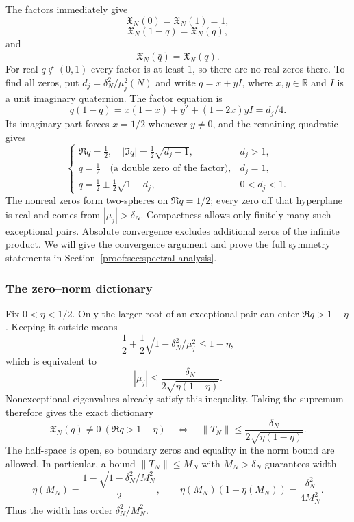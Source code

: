 \documentclass[12pt,a4paper]{amsart}
\numberwithin{equation}{section}
\def\le{\leqslant}
\theoremstyle{plain}
\theoremstyle{definition}
\theoremstyle{remark}
\begin{document}
\label{story:riemann-zeros}
The factors immediately give
\begin{equation}\label{sym:normalization}
 \mathfrak X_N(0)=\mathfrak X_N(1)=1,
\end{equation}
\begin{equation}\label{sym:functional-equation}
 \mathfrak X_N(1-q)=\mathfrak X_N(q),
\end{equation}
and
\begin{equation}\label{sym:conjugation}
 \mathfrak X_N(\bar q)=\overline{\mathfrak X_N(q)}.
\end{equation}
For real $q\notin(0,1)$ every factor is at least $1$, so there
are no real zeros there. To find all zeros, put
$d_j=\delta_N^2/\mu_j^2(N)$ and write $q=x+yI$, where
$x,y\in\mathbb R$ and $I$ is a unit imaginary quaternion.
The factor equation is
\[
 q(1-q)=x(1-x)+y^2+(1-2x)yI=d_j/4.
\]
Its imaginary part forces $x=1/2$ whenever $y\ne0$, and the
remaining quadratic gives
\[
 \begin{cases}
 \Re q=\frac12,\quad |\Im q|=\frac12\sqrt{d_j-1},&d_j>1,\\[1mm]
 q=\frac12\quad\text{(a double zero of the factor)},&d_j=1,\\[1mm]
 q=\frac12\pm\frac12\sqrt{1-d_j},&0<d_j<1.
 \end{cases}
\]
The nonreal zeros form two-spheres on $\Re q=1/2$; every zero
off that hyperplane is real and comes from $|\mu_j|>\delta_N$.
Compactness allows only finitely many such exceptional pairs.
Absolute convergence excludes additional zeros of the infinite
product. We will give the convergence argument and prove the full
symmetry statements in Section~\ref{proof:sec:spectral-analysis}.

\subsubsection{The zero--norm dictionary}

Fix $0<\eta<1/2$. Only the larger root of an exceptional pair
can enter $\Re q>1-\eta$. Keeping it outside means
\[
 \frac12+\frac12\sqrt{1-\delta_N^2/\mu_j^2}
 \le1-\eta,
\]
which is equivalent to
\[
 |\mu_j|\le\frac{\delta_N}{2\sqrt{\eta(1-\eta)}}.
\]
Nonexceptional eigenvalues already satisfy this inequality.
Taking the supremum therefore gives the exact dictionary
\[
 \mathfrak X_N(q)\ne0\ (\Re q>1-\eta)
 \quad\Longleftrightarrow\quad
 \|T_N\|\le\frac{\delta_N}{2\sqrt{\eta(1-\eta)}}.
\]
The half-space is open, so boundary zeros and equality in the
norm bound are allowed. In particular, a bound
$\|T_N\|\le M_N$ with $M_N>\delta_N$ guarantees width
\begin{equation}\label{outline:norm-width-conversion}
 \eta(M_N)=\frac{1-\sqrt{1-\delta_N^2/M_N^2}}2,
 \qquad \eta(M_N)(1-\eta(M_N))=\frac{\delta_N^2}{4M_N^2}.
\end{equation}
Thus the width has order $\delta_N^2/M_N^2$.
\end{document}
